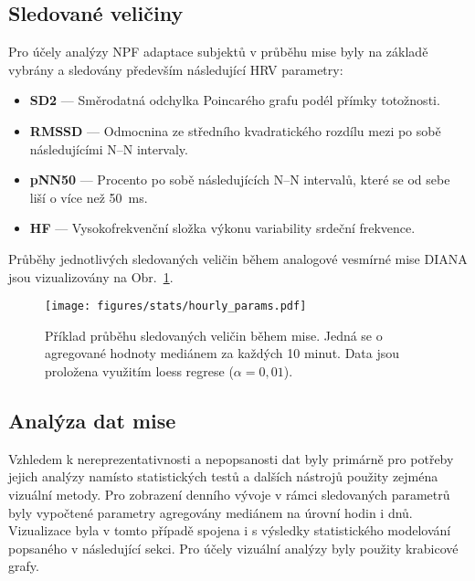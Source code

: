 \subsection{Sledované veličiny}
\label{subsec:sledovane_veliciny}
Pro účely analýzy \gls{NPF} adaptace subjektů v průběhu mise byly na
základě~\cite{Pereira2017,Shaffer2017} vybrány a sledovány především následující
\gls{HRV} parametry:
\begin{itemize}
      \item \textbf{SD2} --- Směrodatná odchylka Poincarého grafu podél přímky
      totožnosti.
      \item \textbf{RMSSD} --- Odmocnina ze středního kvadratického rozdílu mezi
            po sobě následujícími N--N intervaly.
      \item \textbf{pNN50} --- Procento po sobě následujících N--N intervalů,
            které se od sebe liší o více než 50~ms.
      \item \textbf{HF} --- Vysokofrekvenční složka výkonu variability srdeční
            frekvence.
\end{itemize}
Průběhy jednotlivých sledovaných veličin během analogové vesmírné mise DIANA
jsou vizualizovány na Obr.~\ref{fig:params_example}.

\begin{figure}[H]
      \begin{center}
            \texttt{[image: figures/stats/hourly\_params.pdf]}
            \caption{Příklad průběhu sledovaných veličin během mise. Jedná se o
             agregované hodnoty mediánem za každých 10 minut. Data jsou
             proložena využitím loess regrese ($\alpha = 0,01$).}
            \label{fig:params_example}
      \end{center}
\end{figure}

\subsection{Analýza dat mise}
\label{subsec:analyza_diana}
Vzhledem k nereprezentativnosti a nepopsanosti dat byly primárně pro potřeby
jejich analýzy namísto statistických testů a dalších nástrojů použity zejména
vizuální metody. Pro zobrazení denního vývoje v rámci sledovaných parametrů byly
vypočtené parametry agregovány mediánem na úrovní hodin i dnů. Vizualizace byla
v tomto případě spojena i s výsledky statistického modelování popsaného v
následující sekci. Pro účely vizuální analýzy byly použity krabicové grafy.

